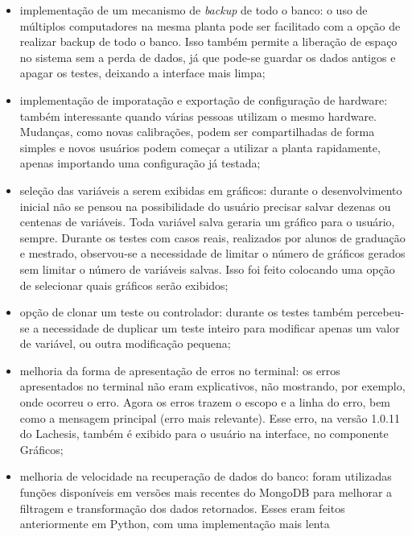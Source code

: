 \begin{itemize}
    \item implementação de um mecanismo de \textit{backup} de todo o banco: o
          uso de múltiplos computadores na mesma planta pode ser facilitado com
          a opção de realizar backup de todo o banco. Isso também permite a
          liberação de espaço no sistema sem a perda de dados, já que pode-se
          guardar os dados antigos e apagar os testes, deixando a interface mais
          limpa;
    \item implementação de imporatação e exportação de configuração de hardware:
          também interessante quando várias pessoas utilizam o mesmo hardware.
          Mudanças, como novas calibrações, podem ser compartilhadas de forma
          simples e novos usuários podem começar a utilizar a planta
          rapidamente, apenas importando uma configuração já testada;
    \item seleção das variáveis a serem exibidas em gráficos: durante o
          desenvolvimento inicial não se pensou na possibilidade do usuário
          precisar salvar dezenas ou centenas de variáveis. Toda variável salva
          geraria um gráfico para o usuário, sempre. Durante os testes com casos
          reais, realizados por alunos de graduação e mestrado, observou-se a
          necessidade de limitar o número de gráficos gerados sem limitar o
          número de variáveis salvas. Isso foi feito colocando uma opção de
          selecionar quais gráficos serão exibidos;
    \item opção de clonar um teste ou controlador: durante os testes também
          percebeu-se a necessidade de duplicar um teste inteiro para modificar
          apenas um valor de variável, ou outra modificação pequena;
    \item melhoria da forma de apresentação de erros no terminal: os erros
          apresentados no terminal não eram explicativos, não mostrando, por
          exemplo, onde ocorreu o erro. Agora os erros trazem o escopo e a linha
          do erro, bem como a mensagem principal (erro mais relevante). Esse
          erro, na versão 1.0.11 do Lachesis, também é exibido para o usuário na
          interface, no componente Gráficos;
    \item melhoria de velocidade na recuperação de dados do banco: foram
          utilizadas funções disponíveis em versões mais recentes do MongoDB
          para melhorar a filtragem e transformação dos dados retornados. Esses
          eram feitos anteriormente em Python, com uma implementação mais lenta

\end{itemize}
